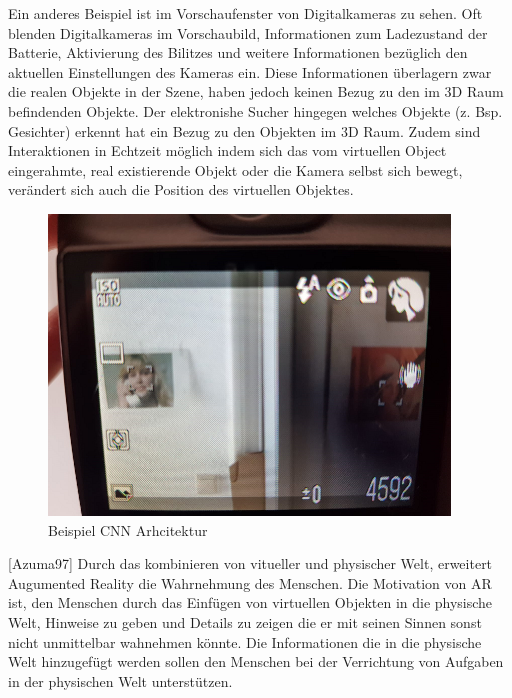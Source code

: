 Ein anderes Beispiel ist im Vorschaufenster von Digitalkameras zu sehen. Oft blenden Digitalkameras im Vorschaubild, Informationen zum Ladezustand der Batterie, Aktivierung des Bilitzes und weitere 
Informationen bezüglich den aktuellen Einstellungen des Kameras ein. Diese Informationen überlagern zwar die realen Objekte in der Szene, haben jedoch keinen Bezug zu den im 3D Raum befindenden Objekte. 
Der elektronishe Sucher hingegen welches Objekte (z. Bsp. Gesichter) erkennt hat ein Bezug zu den Objekten im 3D Raum. Zudem sind Interaktionen in Echtzeit möglich indem sich das vom virtuellen  Object 
eingerahmte, real existierende Objekt oder die Kamera selbst sich bewegt, verändert sich auch die Position des virtuellen Objektes. 

\begin{figure}[H]
	\centering
	\includegraphics[width=0.95\textwidth]{resources/fundamentals/example_camera_screen_ar}
	\caption{Beispiel CNN Arhcitektur \cite{typical_cnn_img}}
	\label{img:cnn_example_network}
\end{figure}

[Azuma97] Durch das kombinieren von vitueller und physischer Welt, erweitert Augumented Reality die Wahrnehmung des Menschen. Die Motivation von AR ist, den Menschen durch das Einfügen
von virtuellen Objekten in die physische Welt, Hinweise zu geben und Details zu zeigen die er mit seinen Sinnen sonst nicht unmittelbar wahnehmen könnte. Die Informationen die in die physische 
Welt hinzugefügt werden sollen den Menschen bei der Verrichtung von Aufgaben in der physischen Welt unterstützen.

